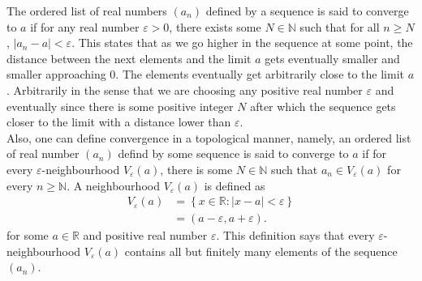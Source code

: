 \documentclass[12pt]{article}
\newcommand{\N}{\mathbb{N}}
\newcommand{\R}{\mathbb{R}}
\begin{document}
       The ordered list of real numbers $(a_{n})$ defined by a sequence is said to converge to $a$ if for any real number $\varepsilon > 0$, there exists some $N\in \N$ such that for all $n\geq N$, $|a_{n}-a|< \varepsilon$. This states that as we go higher in the sequence at some point, the distance between the next elements and the limit $a$ gets eventually smaller and smaller approaching 0. The elements eventually get arbitrarily close to the limit $a$. Arbitrarily in the sense that we are choosing any positive real number $\varepsilon$ and eventually since there is some positive integer $N$ after which the sequence gets closer to the limit with a distance lower than $\varepsilon$.\\
       Also, one can define convergence in a topological manner, namely, an ordered list of real number $(a_{n})$ defind by some sequence is said to converge to $a$ if for every $\varepsilon$-neighbourhood $V_{\varepsilon}(a)$, there is some $N\in \N$ such that $a_{n} \in V_{\varepsilon}(a)$ for every $n\geq \N$. A neighbourhood $V_{\varepsilon}(a)$ is defined as
    \begin{align*}
      V_{\varepsilon}(a) &= \left\{x\in \R: |x-a|<\varepsilon \right\}\\
      &= (a-\varepsilon,a+\varepsilon).
    \end{align*}
    for some $a\in \R$ and positive real number $\varepsilon$. This definition says that every $\varepsilon$-neighbourhood $V_{\varepsilon}(a)$ contains all but finitely many elements of the sequence $(a_{n})$.
\end{document}
